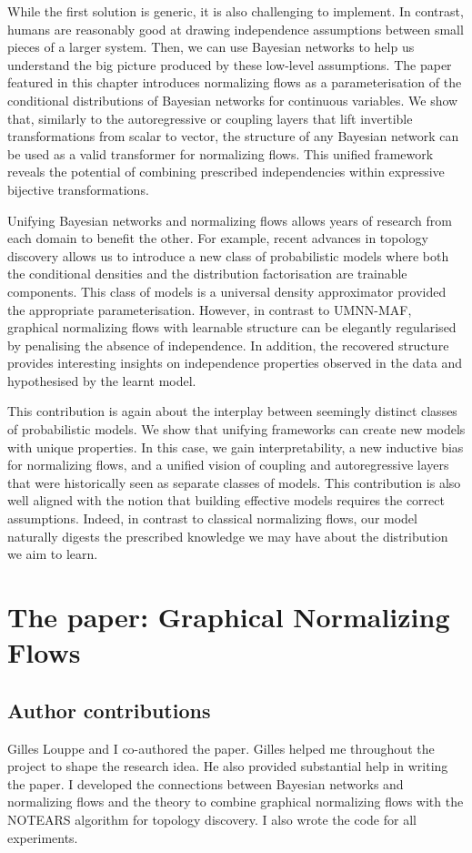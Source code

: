 While the first solution is generic, it is also challenging to implement. In contrast, humans are reasonably good at drawing independence assumptions between small pieces of a larger system. Then, we can use Bayesian networks to help us understand the big picture produced by these low-level assumptions. The paper featured in this chapter introduces normalizing flows as a parameterisation of the conditional distributions of Bayesian networks for continuous variables. We show that, similarly to the autoregressive or coupling layers that lift invertible transformations from scalar to vector, the structure of any Bayesian network can be used as a valid transformer for normalizing flows. This unified framework reveals the potential of combining prescribed independencies within expressive bijective transformations.

Unifying Bayesian networks and normalizing flows allows years of research from each domain to benefit the other. For example, recent advances in topology discovery allows us to introduce a new class of probabilistic models where both the conditional densities and the distribution factorisation are trainable components. This class of models is a universal density approximator provided the appropriate parameterisation. However, in contrast to UMNN-MAF, graphical normalizing flows with learnable structure can be elegantly regularised by penalising the absence of independence. In addition, the recovered structure provides interesting insights on independence properties observed in the data and hypothesised by the learnt model.

This contribution is again about the interplay between seemingly distinct classes of probabilistic models. We show that unifying frameworks can create new models with unique properties. In this case, we gain interpretability, a new inductive bias for normalizing flows, and a unified vision of coupling and autoregressive layers that were historically seen as separate classes of models. This contribution is also well aligned with the notion that building effective models requires the correct assumptions. Indeed, in contrast to classical normalizing flows, our model naturally digests the prescribed knowledge we may have about the distribution we aim to learn.


\section{The paper: Graphical Normalizing Flows}
\subsection{Author contributions}
Gilles Louppe and I co-authored the paper. Gilles helped me throughout the project to shape the research idea. He also provided substantial help in writing the paper. I developed the connections between Bayesian networks and normalizing flows and the theory to combine graphical normalizing flows with the NOTEARS algorithm for topology discovery. I also wrote the code for all experiments.

